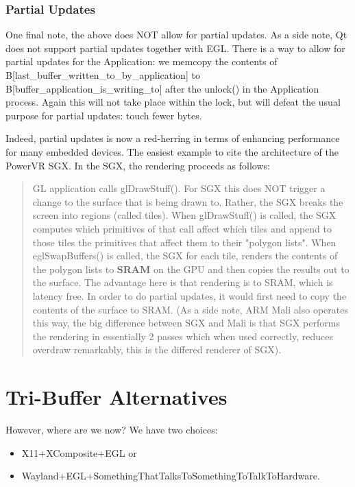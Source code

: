 \documentclass[a4paper,11pt]{article}
\begin{document}
\subsubsection{Partial Updates}
\begin{indenter}{2cm}

One final note, the above does NOT allow for partial updates. As a
side note, Qt does not support partial updates together with EGL.
There is a way to allow for partial updates for the Application:
we memcopy the contents of B[last\_buffer\_written\_to\_by\_application] to
B[buffer\_application\_is\_writing\_to] after the unlock() in the
Application process. Again this will not take place within the lock,
but will defeat the usual purpose for partial updates: touch fewer bytes.

Indeed, partial updates is now a red-herring in terms of enhancing
performance for many embedded devices. The easiest example to cite
the architecture of the PowerVR SGX. In the SGX, the rendering
proceeds as follows:

\begin{quote}
GL application calls glDrawStuff(). For SGX this does NOT
trigger a change to the surface that is being drawn to. Rather,
the SGX breaks the screen into regions (called tiles). When
glDrawStuff() is called, the SGX computes which primitives of
that call affect which tiles and append to those tiles the
primitives that affect them to their "polygon lists". When
eglSwapBuffers() is called, the SGX for each tile, renders
the contents of the polygon lists to \textbf{SRAM} on the GPU and
then copies the results out to the surface. The advantage
here is that rendering is to SRAM, which is latency free.
In order to do partial updates, it would first need to copy
the contents of the surface to SRAM. (As a side note, ARM Mali
also operates this way, the big difference between SGX and Mali
is that SGX performs the rendering in essentially 2 passes
which when used correctly, reduces overdraw remarkably, this
is the differed renderer of SGX).
\end{quote}

\end{indenter}
\section{Tri-Buffer Alternatives}
\begin{indenter}{2cm}

However, where are we now? We have two choices:
\begin{itemize}
\item X11+XComposite+EGL or
\item Wayland+EGL+SomethingThatTalksToSomethingToTalkToHardware.
\end{itemize}

\end{indenter}
\end{document}
